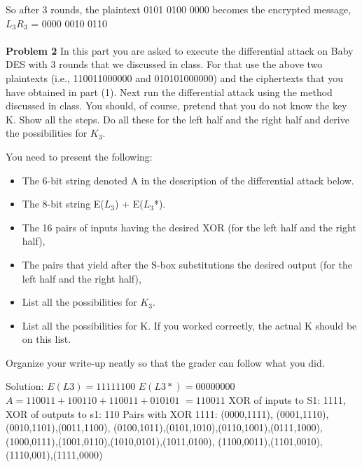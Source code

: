 \documentclass[12pt,letterpaper,final]{report}
\begin{document}
So after 3 rounds, the plaintext 0101 0100 0000 becomes the encrypted message, $L_3R_3$ = 0000 0010 0110 \\
 \\


\bigskip\noindent\textbf{Problem 2} In this part you are asked to execute the differential attack on Baby DES with 3 rounds that we discussed in class. For that use the above two plaintexts  (i.e., 110011000000 and 010101000000) and the ciphertexts that you have obtained in part (1).  Next run the differential attack using the method discussed in class.  You should, of course, pretend that you do not know the key K.  Show all the steps.  Do all these for the left half and the right half and derive the possibilities for $K_3$. 
\bigskip

You need to present the following:

\begin{itemize}
	\item The 6-bit string denoted A in the description of the differential attack below.
	\item The 8-bit string E($L_3$) + E($L_3$*). 
	\item The 16 pairs of inputs having the desired XOR (for the left half and the right half), 
	\item The pairs that yield after the S-box substitutions the desired output (for the left half and the right half),
	\item List all the possibilities for $K_3$.
	\item List all the possibilities for K. If you worked correctly, the actual K should be on this list.
\end{itemize}

Organize your write-up neatly so that the grader can follow what you did.


\bigskip Solution: 
\newline $E(L3) = 1111 1100$
\newline $E(L3*) = 0000 0000$
\newline $A = 110011 + 100110 + 110011 + 010101$
\newline $= 110011$
\newline XOR of inputs to S1: 1111, XOR of outputs to s1: 110
\newline Pairs with XOR 1111:
\newline (0000,1111), (0001,1110),(0010,1101),(0011,1100),
\newline (0100,1011),(0101,1010),(0110,1001),(0111,1000),
\newline (1000,0111),(1001,0110),(1010,0101),(1011,0100),
\newline (1100,0011),(1101,0010),(1110,001),(1111,0000)
\end{document}
